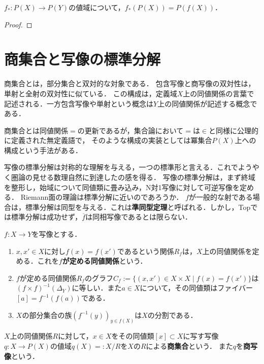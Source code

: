 \documentclass[uplatex,dvipdfmx]{jsreport}
\begin{document}
\begin{problem}[A2.5.3]
    $f_*:P(X)\to P(Y)$の値域について，$f_*(P(X))=P(f(X))$．
\end{problem}
\begin{proof}
    
\end{proof}

\section{商集合と写像の標準分解}

\begin{screen}
    商集合とは，部分集合と双対的な対象である．
    包含写像と商写像の双対性は，単射と全射の双対性に似ている．
    この構成は，定義域$X$上の同値関係の言葉で記述される．一方包含写像や単射という概念は$Y$上の同値関係が記述する概念である．

    商集合とは同値関係$=$の更新であるが，集合論において$=$は$\in$と同様に公理的に定義された無定義語で，
    そのような構成の実装としては冪集合$P(X)$上への構成という手法がある．

    写像の標準分解は対称的な理解を与える，一つの標準形と言える．これでようやく圏論の見せる数理自然に到達したの感を得る．
    写像の標準分解は，まず終域を整形し，始域について同値類に畳み込み，N対1写像に対して可逆写像を定める．
    Riemann面の理論は標準分解に近いのであろうか．
    $f$が一般的な射である場合は，標準分解は同型を与える．これは\textbf{準同型定理}と呼ばれる．しかし，Topでは標準分解は成功せず，$\overline{f}$は同相写像であるとは限らない．
\end{screen}

\begin{proposition}[写像が定める同値関係]
    $f:X\to Y$を写像とする．
    \begin{enumerate}
        \item $x,x'\in X$に対し$f(x)=f(x')$であるという関係$R_f$は，$X$上の同値関係を定める．これを\textbf{$f$が定める同値関係}という．
        \item $f$が定める同値関係$R_f$のグラフ$C_f:=\{(x,x')\in X\times X\mid f(x)=f(x')\}$は$(f\times f)^{-1}(\Delta_Y)$に等しい．また$a\in X$について，その同値類はファイバー$[a]=f^{-1}(f(a))$である．
        \item $X$の部分集合の族$(f^{-1}(y))_{y\in f(X)}$は$X$の分割である．
    \end{enumerate}
\end{proposition}

\begin{definition}
    $X$上の同値関係$R$に対して，$x\in X$をその同値類$[x]\subset X$に写す写像$q:X\to P(X)$の値域$q(X)=:X/R$を$X$の$R$による\textbf{商集合}という．
    また$q$を\textbf{商写像}という．
\end{definition}
\end{document}
